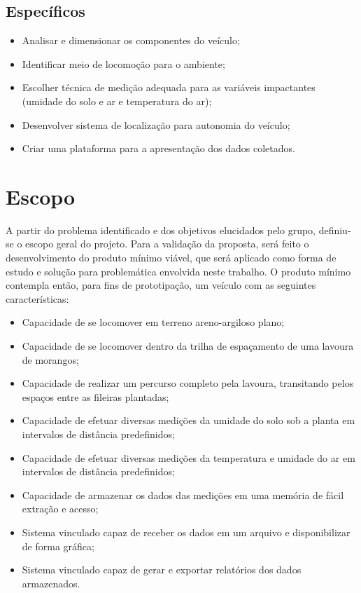   \subsection{Específicos}

  \begin{itemize}
    \item Analisar e dimensionar os componentes do veículo;
    \item Identificar meio de locomoção para o ambiente;
    \item Escolher técnica de medição adequada para as variáveis impactantes (umidade do solo e ar e temperatura do ar);
    \item Desenvolver sistema de localização para autonomia do veículo;
    \item Criar uma plataforma para a apresentação dos dados coletados.
  \end{itemize}

  \vfill
  \pagebreak

  \section{Escopo}

  A partir do problema identificado e dos objetivos elucidados pelo grupo,
  definiu-se o escopo geral do projeto. Para a validação da proposta, será feito
  o desenvolvimento do produto mínimo viável, que será aplicado como forma de
  estudo e solução para problemática envolvida neste trabalho. O produto mínimo
  contempla então, para fins de prototipação, um veículo com as seguintes características:

  \begin{itemize}
    \item Capacidade de se locomover em terreno areno-argiloso plano;
    \item Capacidade de se locomover dentro da trilha de espaçamento de uma lavoura de morangos;
    \item Capacidade de realizar um percurso completo pela lavoura, transitando pelos espaços entre as fileiras plantadas;
    \item Capacidade de efetuar diversas medições da umidade do solo sob a planta em intervalos de distância predefinidos;
    \item Capacidade de  efetuar diversas medições da temperatura e umidade do ar em intervalos de distância predefinidos;
    \item Capacidade de armazenar os dados das medições em uma memória de fácil extração e acesso;
    \item Sistema vinculado capaz de receber os dados em um arquivo e disponibilizar de forma gráfica;
    \item Sistema vinculado capaz de gerar e exportar relatórios dos dados armazenados.
  \end{itemize}
